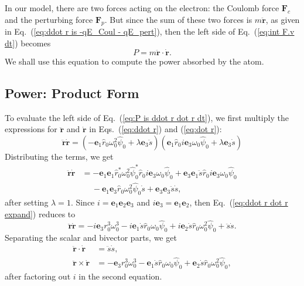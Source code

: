 \documentclass[twocolumn,showpacs,preprintnumbers,amsmath,amssymb]{revtex4}
\begin{document}
In our model, there are two forces acting on the electron: the Coulomb force $\mathbf F_{c}$ and the perturbing force $\mathbf F_{p}$.  But since the sum of these two forces is $m\ddot{\mathbf r}$, as given in Eq.~(\ref{eq:ddot r is -qE_Coul - qE_pert}), then the left side of Eq.~(\ref{eq:int F.v dt}) becomes
\begin{equation}
\label{eq:P is ddot r dot r dt}
P = m\ddot{\mathbf r}\cdot\dot{\mathbf r}.
\end{equation}
We shall use this equation to compute the power absorbed by the atom.

\subsection{Power: Product Form}

To evaluate the left side of Eq.~(\ref{eq:P is ddot r dot r dt}), we first multiply the expressions for $\ddot{\mathbf r}$ and $\dot{\mathbf r}$ in Eqs.~(\ref{eq:ddot r}) and (\ref{eq:dot r}):
\begin{equation}
\ddot{\mathbf r}\dot{\mathbf r} = (-\mathbf e_1\hat r_0\omega_0^2\hat\psi_0 +\lambda\mathbf e_3\ddot s)(\mathbf e_1\hat r_0 i \mathbf e_3 \omega_0\hat\psi_0 +\lambda\mathbf e_3\dot s)
\end{equation}
Distributing the terms, we get
\begin{align}
\label{eq:ddot r dot r expand}
\ddot{\mathbf r}\dot{\mathbf r} &= -\mathbf e_1\mathbf e_1\hat r_0^*\omega_0^2\hat\psi_0^*\hat r_0 i \mathbf e_3 \omega_0\hat\psi_0 +\mathbf e_3\mathbf e_1\ddot s\hat r_0 i \mathbf e_3 \omega_0\hat\psi_0 \nonumber \\
 & \quad \   - \mathbf e_1\mathbf e_3\hat r_0\omega_0^2\hat\psi_0\dot s + \mathbf e_3\mathbf e_3\ddot s\dot s,
\end{align}
after setting $\lambda = 1$.  Since $i = \mathbf e_1\mathbf e_2\mathbf e_3$ and $ i \mathbf e_3  = \mathbf e_1\mathbf e_2$, then Eq.~(\ref{eq:ddot r dot r expand}) reduces to
\begin{equation}
\ddot{\mathbf r}\dot{\mathbf r} = -i\mathbf e_3 r_0^3\omega_0^3 - i\mathbf e_1\dot s \hat r_0\omega_0\hat\psi_0 + i\mathbf e_2\dot s\hat r_0\omega_0^2\hat\psi_0 + \ddot s\dot s.
\end{equation}
Separating the scalar and bivector parts, we get
\begin{subequations}
\begin{align}
\label{eq:ddot r . dot r}
\ddot{\mathbf r}\cdot\dot{\mathbf r} &= \ddot s\dot s,\\
\ddot{\mathbf r}\times\dot{\mathbf r} &= -\mathbf e_3 r_0^3\omega_0^3 - \mathbf e_1\dot s \hat r_0\omega_0\hat\psi_0 + \mathbf e_2\dot s\hat r_0\omega_0^2\hat\psi_0,
\end{align}
\end{subequations}
after factoring out $i$ in the second equation.
\end{document}
